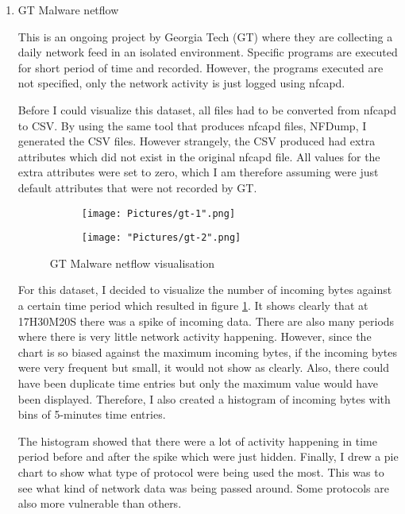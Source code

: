 \documentclass[11pt]{article}
\begin{document}
\begin{enumerate}
  \item{GT Malware netflow}

  This is an ongoing project by Georgia Tech (GT) \cite{bg-dataset-gt} where they are collecting a daily network feed in an isolated environment. Specific programs are executed for short period of time and recorded. However, the programs executed are not specified, only the network activity is just logged using nfcapd. 

  Before I could visualize this dataset, all files had to be converted from nfcapd to CSV. By using the same tool that produces nfcapd files, NFDump, I generated the CSV files. However strangely, the CSV produced had extra attributes which did not exist in the original nfcapd file. All values for the extra attributes were set to zero, which I am therefore assuming were just default attributes that were not recorded by GT.

\begin{figure}[h!]
    \centering
    \begin{subfigure}{\linewidth}
      \texttt{[image: Pictures/gt-1".png]}
    \end{subfigure}
    \begin{subfigure}{\linewidth}
      \texttt{[image: "Pictures/gt-2".png]}
    \end{subfigure}
    \caption{GT Malware netflow visualisation}
    \label{fig:gt-graph}
\end{figure}

  For this dataset, I decided to visualize the number of incoming bytes against a certain time period which resulted in figure \ref{fig:gt-graph}. It shows clearly that at 17H30M20S there was a spike of incoming data. There are also many periods where there is very little network activity happening. However, since the chart is so biased against the maximum incoming bytes, if the incoming bytes were very frequent but small, it would not show as clearly. Also, there could have been duplicate time entries but only the maximum value would have been displayed. Therefore, I also created a histogram of incoming bytes with bins of 5-minutes time entries.

  The histogram showed that there were a lot of activity happening in time period before and after the spike which were just hidden. 
Finally, I drew a pie chart to show what type of protocol were being used the most. This was to see what kind of network data was being passed around. Some protocols are also more vulnerable than others. 
 

\end{enumerate}
\end{document}
